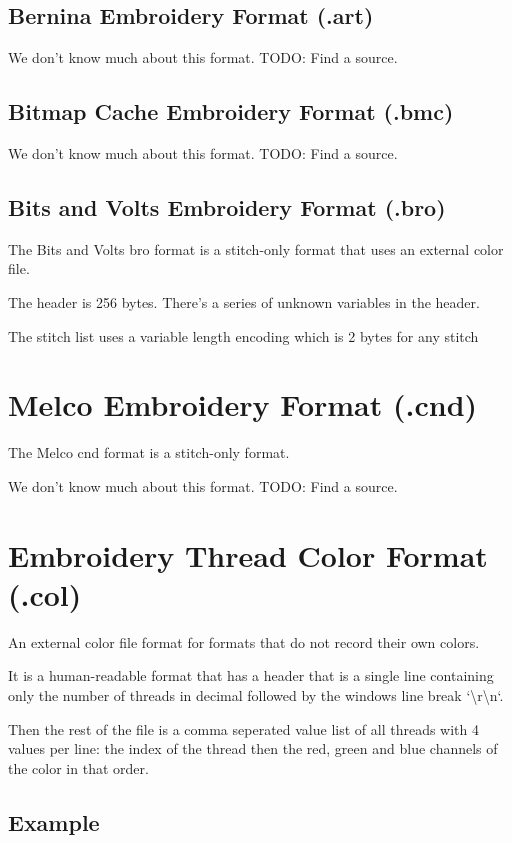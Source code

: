 \documentclass{report}
\begin{document}
\subsection{Bernina Embroidery Format (.art)}

We don't know much about this format. TODO: Find a source.

\subsection{Bitmap Cache Embroidery Format (.bmc)}

We don't know much about this format. TODO: Find a source.

\subsection{Bits and Volts Embroidery Format (.bro)}

The Bits and Volts bro format is a stitch-only format that uses an external color file.

The header is 256 bytes. There's a series of unknown variables in the header.

The stitch list uses a variable length encoding which is 2 bytes for any stitch

\section{Melco Embroidery Format (.cnd)}

The Melco cnd format is a stitch-only format.

We don't know much about this format. TODO: Find a source.

\section{Embroidery Thread Color Format (.col)}

An external color file format for formats that do not record their own colors. 

It is a human-readable format that has a header that is a single line containing only the number of threads in decimal followed by the windows line break `\textbackslash{}r\textbackslash{}n`.

Then the rest of the file is a comma seperated value list of all threads with 4 values per line: the index of the thread then the red, green and blue channels of the color in that order.

\subsection{Example}
\end{document}
